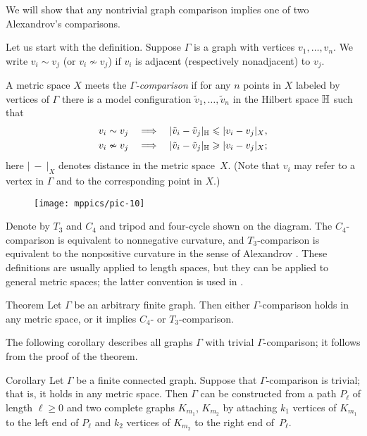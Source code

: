 \documentclass{article}
\begin{document}
We will show that any nontrivial graph comparison implies one of two Alexandrov's comparisons.

Let us start with the definition.
Suppose $\Gamma$ is a graph with vertices $v_1,\dots,v_n$.
We write $v_i\sim v_j$ (or $v_i\nsim v_j$) if $v_i$ is adjacent (respectively nonadjacent) to $v_j$.

A metric space $X$ meets the \emph{$\Gamma$-comparison} if for any $n$ points in $X$ labeled by vertices of $\Gamma$ there is a model configuration $\tilde v_1,\dots,\tilde v_n$ in the Hilbert space $\mathbb H$ such that 
\begin{align*}
v_i\sim v_j\quad&\Longrightarrow\quad|\tilde v_i-\tilde v_j|_{\mathbb H}\leqslant | v_i-v_j|_{X},
\\
v_i\nsim v_j\quad&\Longrightarrow\quad|\tilde v_i-\tilde v_j|_{\mathbb H}\geqslant | v_i-v_j|_{X};
\end{align*}
here $|\ -\ |_X$ denotes distance in the metric space~$X$.
(Note that $v_i$ may refer to a vertex in $\Gamma$ and to the corresponding point in $X$.)

\begin{wrapfigure}{r}{35 mm}
\vskip-0mm
\centering
\texttt{[image: mppics/pic-10]}
\end{wrapfigure}

Denote by $T_3$ and $C_4$ and tripod and four-cycle shown on the diagram.
The $C_4$-comparison is equivalent to nonnegative curvature,
and $T_3$-comparison is equivalent to the nonpositive curvature in the sense of Alexandrov \cite{lebedeva-petrunin-zolotov}.
These definitions are usually applied to length spaces, but they can be applied to general metric spaces;
the latter convention is used in \cite{alexander2019alexandrov}.

\begin{thm}{Theorem}
Let $\Gamma$ be an arbitrary finite graph.
Then either $\Gamma$-comparison holds in any metric space,
or it implies $C_4$- or $T_3$-comparison.
\end{thm}

The following corollary describes all graphs $\Gamma$ with trivial $\Gamma$-comparison;
it follows from the proof of the theorem.

\begin{thm}{Corollary} Let $\Gamma$ be a finite connected graph.
Suppose that $\Gamma$-comparison is trivial;
that is, it holds in any metric space.
Then $\Gamma$ can be constructed from a path $P_{\ell}$ of length $\ell\ge 0$ and two complete graphs $K_{m_1}$, $K_{m_2}$ by attaching $k_1$ vertices of $K_{m_1}$ to the left end of $P_{\ell}$ and $k_2$ vertices of $K_{m_2}$ to the right end of~$P_{\ell}$.
\end{thm}
\end{document}
